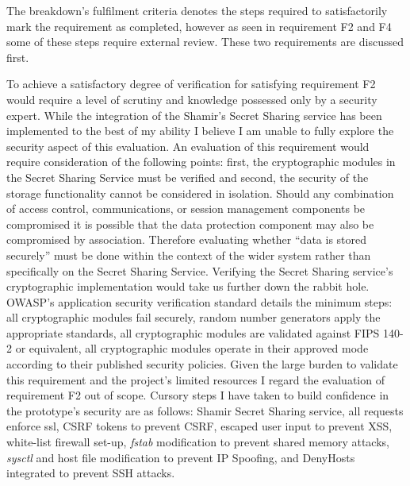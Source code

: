 The breakdown's fulfilment criteria denotes the steps required to satisfactorily mark the requirement as completed, however as seen in requirement F2 and F4 some of these steps require external review. These two requirements are discussed first.
\par
To achieve a satisfactory degree of verification for satisfying requirement F2 would require a level of scrutiny and knowledge possessed only by a security expert. While the integration of the Shamir's Secret Sharing service has been implemented to the best of my ability I believe I am unable to fully explore the security aspect of this evaluation. An evaluation of this requirement would require consideration of the following points: first, the cryptographic modules in the Secret Sharing Service must be verified and second, the security of the storage functionality cannot be considered in isolation. Should any combination of access control, communications, or session management components be compromised it is possible that the data protection component may also be compromised by association. Therefore evaluating whether ``data is stored securely'' must be done within the context of the wider system rather than specifically on the Secret Sharing Service. Verifying the Secret Sharing service's cryptographic implementation would take us further down the rabbit hole. OWASP's application security verification standard \cite{OWASP:online} details the minimum steps: all cryptographic modules fail securely, random number generators apply the appropriate standards, all cryptographic modules are validated against FIPS 140-2 or equivalent, all cryptographic modules operate in their approved mode according to their published security policies. Given the large burden to validate this requirement and the project's limited resources I regard the evaluation of requirement F2 out of scope. Cursory steps I have taken to build confidence in the prototype's security are as follows: Shamir Secret Sharing service, all requests enforce ssl, CSRF tokens to prevent CSRF, escaped user input to prevent XSS, 
white-list firewall set-up, \textit{fstab} modification to prevent shared memory attacks, \textit{sysctl} and host file modification to prevent IP Spoofing, and DenyHosts \cite{DenyH6:online} integrated to prevent SSH attacks.
\par
